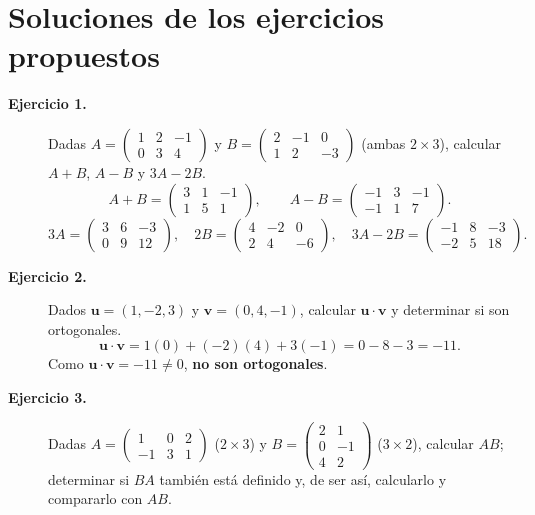 \documentclass[11pt,letterpaper]{article}
\theoremstyle{definition}
\theoremstyle{plain}
\newcommand{\vv}[1]{\mathbf{#1}}
\begin{document}
\section{Soluciones de los ejercicios propuestos}

\begin{description}

\item[\textbf{Ejercicio 1.}]
Dadas $A=\begin{pmatrix}1&2&-1\\0&3&4\end{pmatrix}$ y $B=\begin{pmatrix}2&-1&0\\1&2&-3\end{pmatrix}$
(ambas $2\times 3$), calcular $A+B$, $A-B$ y $3A-2B$.
\[
  A+B = \begin{pmatrix}3&1&-1\\1&5&1\end{pmatrix}, \qquad
  A-B = \begin{pmatrix}-1&3&-1\\-1&1&7\end{pmatrix}.
\]
\[
  3A = \begin{pmatrix}3&6&-3\\0&9&12\end{pmatrix}, \quad
  2B = \begin{pmatrix}4&-2&0\\2&4&-6\end{pmatrix}, \quad
  3A-2B = \boxed{\begin{pmatrix}-1&8&-3\\-2&5&18\end{pmatrix}.}
\]

\item[\textbf{Ejercicio 2.}]
Dados $\vv{u}=(1,-2,3)$ y $\vv{v}=(0,4,-1)$, calcular $\vv{u}\cdot\vv{v}$ y determinar si son
ortogonales.
\[
  \vv{u}\cdot\vv{v} = 1(0) + (-2)(4) + 3(-1) = 0 - 8 - 3 = \boxed{-11.}
\]
Como $\vv{u}\cdot\vv{v}=-11\neq 0$, \textbf{no son ortogonales}.

\item[\textbf{Ejercicio 3.}]
Dadas $A=\begin{pmatrix}1&0&2\\-1&3&1\end{pmatrix}$ ($2\times 3$) y
$B=\begin{pmatrix}2&1\\0&-1\\4&2\end{pmatrix}$ ($3\times 2$), calcular $AB$; determinar si $BA$
también está definido y, de ser así, calcularlo y compararlo con $AB$.


\end{description}
\end{document}
